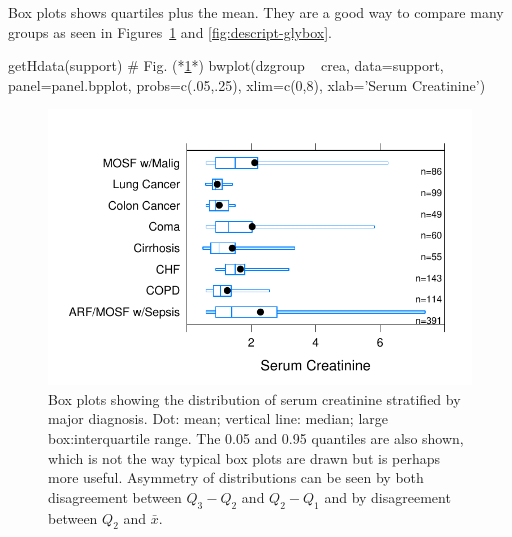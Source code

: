 \item Box plots shows quartiles plus the mean.  They are a good way to
  compare many groups as seen in Figures~\ref{fig:descript-bwplot} and
  \ref{fig:descript-glybox}. 
\begin{Schunk}
\begin{Sinput}
getHdata(support)   # Fig. (*\ref{fig:descript-bwplot}*)
bwplot(dzgroup ~ crea, data=support, panel=panel.bpplot,
       probs=c(.05,.25), xlim=c(0,8), xlab='Serum Creatinine')
\end{Sinput}
\begin{figure}[htbp]

\centerline{\includegraphics{descript-bwplot-1} }

\caption[Box plots with 0.05 and 0.95 quantiles]{Box plots showing the distribution of serum creatinine  stratified by major diagnosis.  Dot: mean; vertical line: median; large box:interquartile range.  The 0.05 and 0.95 quantiles are also shown, which is not the way typical box plots are drawn but is perhaps more useful.  Asymmetry of distributions can be seen by both disagreement between $Q_{3}-Q_{2}$ and $Q_{2}-Q_{1}$ and by disagreement between $Q_{2}$ and $\bar{x}$.}\label{fig:descript-bwplot}
\end{figure}
\end{Schunk}


